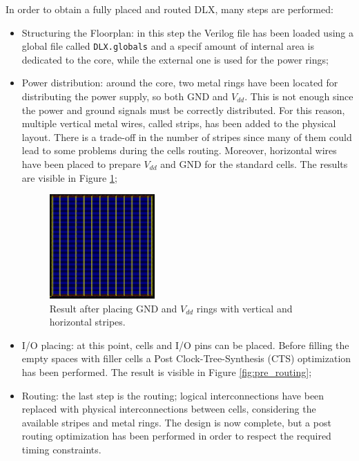 In order to obtain a fully placed and routed DLX, many steps are performed:
\begin{itemize}
    \item Structuring the Floorplan: in this step the Verilog file has been loaded using a global file called \texttt{DLX.globals} and a specif amount of internal area is dedicated to the core, while the external one is used for the power rings;
    \item Power distribution: around the core, two metal rings have been located for distributing the power supply, so both GND and $V_{dd}$. This is not enough since the power and ground signals must be correctly distributed. For this reason, multiple vertical metal wires, called strips, has been added to the physical layout. There is a trade-off in the number of stripes since many of them could lead to some problems during the cells routing. Moreover, horizontal wires have been placed to prepare $V_{dd}$ and GND for the standard cells. The results are visible in Figure \ref{stripes};
    \begin{figure}[h]   
        \centering
        \includegraphics[width=0.38\textwidth]{chapters/9_PhysicalDesign/images/pwr_distribution.png}
        \caption{Result after placing GND and $V_{dd}$ rings with vertical and horizontal stripes.}
        \label{stripes}
    \end{figure}
    
    \item I/O placing: at this point, cells and I/O pins can be placed. Before filling the empty spaces with filler cells a Post Clock-Tree-Synthesis (CTS) optimization has been performed. The result is visible in Figure \ref{fig:pre_routing};
    \item Routing: the last step is the routing; logical interconnections have been replaced with physical interconnections between cells, considering the available stripes and metal rings. The design is now complete, but a post routing optimization has been performed in order to respect the required timing constraints.
\end{itemize}

